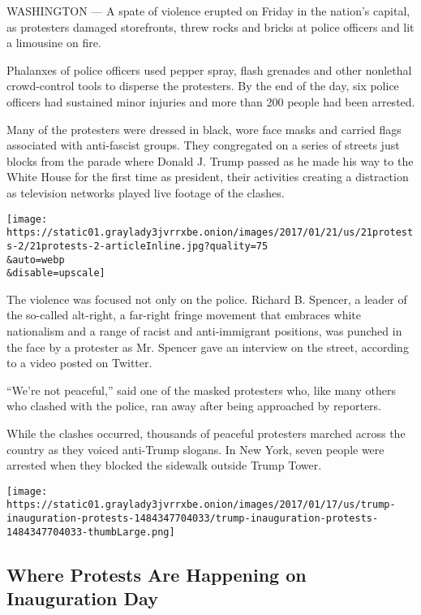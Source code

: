 WASHINGTON --- A spate of violence erupted on Friday in the nation's
capital, as protesters damaged storefronts, threw rocks and bricks at
police officers and lit a limousine on fire.

Phalanxes of police officers used pepper spray, flash grenades and other
nonlethal crowd-control tools to disperse the protesters. By the end of
the day, six police officers had sustained minor injuries and more than
200 people had been arrested.

Many of the protesters were dressed in black, wore face masks and
carried flags associated with anti-fascist groups. They congregated on a
series of streets just blocks from the parade where Donald J. Trump
passed as he made his way to the White House for the first time as
president, their activities creating a distraction as television
networks played live footage of the clashes.

\texttt{[image: https://static01.graylady3jvrrxbe.onion/images/2017/01/21/us/21protests-2/21protests-2-articleInline.jpg?quality=75\\\&auto=webp\\\&disable=upscale]}

The violence was focused not only on the police. Richard B. Spencer, a
leader of the so-called alt-right, a far-right fringe movement that
embraces white nationalism and a range of racist and anti-immigrant
positions, was punched in the face by a protester as Mr. Spencer gave an
interview on the street, according to a video posted on Twitter.

``We're not peaceful,'' said one of the masked protesters who, like many
others who clashed with the police, ran away after being approached by
reporters.

While the clashes occurred, thousands of peaceful protesters marched
across the country as they voiced anti-Trump slogans. In New York, seven
people were arrested when they blocked the sidewalk outside Trump Tower.

\href{https://www.nytimes3xbfgragh.onion/interactive/2017/01/17/us/inauguration-protests.html}{}

\texttt{[image: https://static01.graylady3jvrrxbe.onion/images/2017/01/17/us/trump-inauguration-protests-1484347704033/trump-inauguration-protests-1484347704033-thumbLarge.png]}

\hypertarget{where-protests-are-happening-on-inauguration-day}{%
\subsection{Where Protests Are Happening on Inauguration
Day}\label{where-protests-are-happening-on-inauguration-day}}

